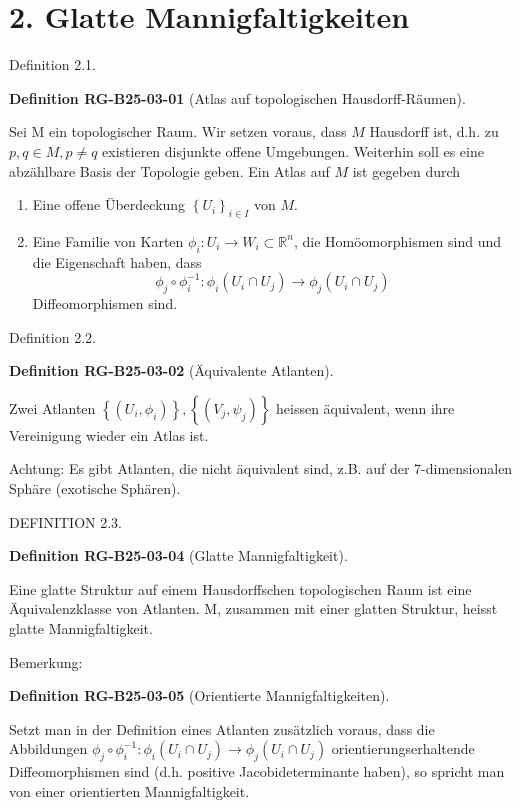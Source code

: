 \documentclass[10pt, letterpaper]{article}
\newcommand{\CustomHeading}[3]{%
  \par\medskip\noindent%
  \textbf{#1 #2} \textnormal{(#3)}.\enskip%
}
\newenvironment{DEF}[2]{\begin{unitbox}\CustomHeading{Definition}{#1}{#2}}{\end{unitbox}}
\begin{document}
\section*{2. Glatte Mannigfaltigkeiten}

Definition 2.1. 

\begin{DEF}{RG-B25-03-01}{Atlas auf topologischen Hausdorff-Räumen}
Sei M ein topologischer Raum. Wir setzen voraus, dass $M$ Hausdorff ist, d.h. zu $p, q \in M, p \neq q$ existieren disjunkte offene Umgebungen. Weiterhin soll es eine abzählbare Basis der Topologie geben. Ein Atlas auf $M$ ist gegeben durch
\begin{enumerate}
  \item Eine offene Überdeckung $\left\{U_{i}\right\}_{i \in I}$ von $M$.
  \item Eine Familie von Karten $\phi_{i}: U_{i} \rightarrow W_{i} \subset \mathbb{R}^{n}$, die Homöomorphismen sind und die Eigenschaft haben, dass
  $$
  \phi_{j} \circ \phi_{i}^{-1}: \phi_{i}\left(U_{i} \cap U_{j}\right) \rightarrow \phi_{j}\left(U_{i} \cap U_{j}\right)
  $$
  Diffeomorphismen sind.
\end{enumerate}
\end{DEF}



Definition 2.2. 

\begin{DEF}{RG-B25-03-02}{Äquivalente Atlanten}
Zwei Atlanten $\left\{\left(U_{i}, \phi_{i}\right)\right\},\left\{\left(V_{j}, \psi_{j}\right)\right\}$ heissen äquivalent, wenn ihre Vereinigung wieder ein Atlas ist.
\end{DEF}

Achtung: Es gibt Atlanten, die nicht äquivalent sind, z.B. auf der 7-dimensionalen Sphäre (exotische Sphären).

DEFINITION 2.3. 


\begin{DEF}{RG-B25-03-04}{Glatte Mannigfaltigkeit}
Eine glatte Struktur auf einem Hausdorffschen topologischen Raum ist eine Äquivalenzklasse von Atlanten. M, zusammen mit einer glatten Struktur, heisst glatte Mannigfaltigkeit.
\end{DEF}



Bemerkung: 

\begin{DEF}{RG-B25-03-05}{Orientierte Mannigfaltigkeiten}
Setzt man in der Definition eines Atlanten zusätzlich voraus, dass die Abbildungen $\phi_{j} \circ \phi_{i}^{-1}: \phi_{i}\left(U_{i} \cap U_{j}\right) \rightarrow \phi_{j}\left(U_{i} \cap U_{j}\right)$ orientierungserhaltende Diffeomorphismen sind (d.h. positive Jacobideterminante haben), so spricht man von einer orientierten Mannigfaltigkeit.
\end{DEF}
\end{document}
